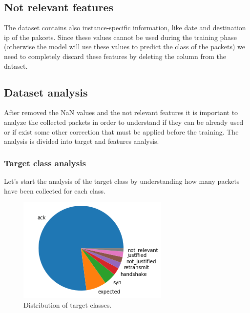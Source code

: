 \documentclass[sigconf]{acmart}
\begin{document}
    \subsection{Not relevant features}
    The dataset contains also instance-specific information, like date and destination ip of the pakcets. Since these values cannot be used during the training phase (otherwise the model will use these values to predict the class of the packets) we need to completely discard these features by deleting the column from the dataset.

    \subsection{Dataset analysis}
    After removed the NaN values and the not relevant features it is important to analyze the collected packets in order to understand if they can be already used or if exist some other correction that must be applied before the training. The analysis is divided into target and features analysis.

    \subsubsection{Target class analysis}
    Let's start the analysis of the target class by understanding how many packets have been collected for each class.
    \begin{figure}[h!]
        \includegraphics[width=0.8\linewidth]{img/target_class_distribution.png}
        \caption{Distribution of target classes.}
        \label{fig:target_class_distribution}
    \end{figure}
\end{document}
